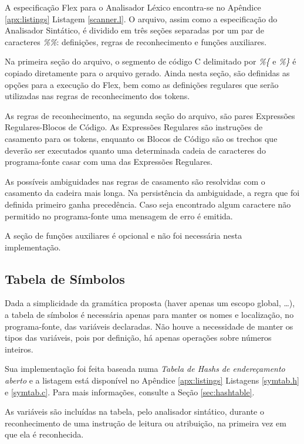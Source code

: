 A especificação Flex para o Analisador Léxico encontra-se no Apêndice
\ref{apx:listings} Listagem \ref{scanner.l}. O arquivo, assim como a
especificação do Analisador Sintático, é dividido em três seções separadas
por um par de caracteres \emph{\%\%}: definições, regras de reconhecimento e
funções auxiliares.

Na primeira seção do arquivo, o segmento de código C delimitado por
\emph{\%\{} e \emph{\%\}} é copiado diretamente para o arquivo gerado. Ainda
nesta seção, são definidas as opções para a execução do Flex, bem como as
definições regulares que serão utilizadas nas regras de reconhecimento dos
tokens.

As regras de reconhecimento, na segunda seção do arquivo, são pares Expressões
Regulares-Blocos de Código. As Expressões Regulares são instruções de
casamento para os tokens, enquanto os Blocos de Código são os trechos que
deverão ser executados quanto uma determinada cadeia de caracteres do
programa-fonte casar com uma das Expressões Regulares.

As possíveis ambiguidades nas regras de casamento são resolvidas com o
casamento da cadeira mais longa. Na persistência da ambiguidade, a regra que
foi definida primeiro ganha precedência. Caso seja encontrado algum caractere
não permitido no programa-fonte uma mensagem de erro é emitida.

A seção de funções auxiliares é opcional e não foi necessária nesta
implementação.


\subsection{Tabela de Símbolos}
\label{sec:symtab}

Dada a simplicidade da gramática proposta (haver apenas um escopo global,
\dots), a tabela de símbolos é necessária apenas para manter os nomes e
localização, no programa-fonte, das variáveis declaradas. Não houve a
necessidade de manter os tipos das variáveis, pois por definição, há
apenas operações sobre números inteiros.

Sua implementação foi feita baseada numa \emph{Tabela de Hashs de
endereçamento aberto} e a listagem está disponível no Apêndice
\ref{apx:listings} Listagens \ref{symtab.h} e \ref{symtab.c}. Para
mais informações, consulte a Seção \ref{sec:hashtable}.

As variáveis são incluídas na tabela, pelo analisador sintático, durante o
reconhecimento de uma instrução de leitura ou atribuição, na primeira vez em
que ela é reconhecida.

